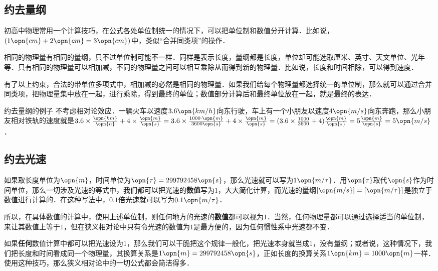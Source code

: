 
\subsection{约去量纲}

初高中物理常用一个计算技巧，在公式各处单位制统一的情况下，可以把单位制和数值分开计算．比如说，$(1\opn{cm}+2\opn{cm}=3\opn{cm})$中，类似“合并同类项”的操作．

相同的物理量有相同的量纲，只不过单位制可能不一样．同样是表示长度，量纲都是长度，单位却可能选取厘米、英寸、天文单位、光年等．只有相同的物理量可以相加减，不同的物理量之间可以相互乘除从而得到新的物理量．比如说，长度和时间相除，可以得到速度．

有了以上约束，合法的带单位多项式中，相加减的必然是相同的物理量．如果我们给每个物理量都选择统一的单位制，那么就可以通过合并同类项，把物理量集中放在一起，进行乘除，得到最终的单位；数值部分计算后和最终单位放在一起，就是最终的表达．

\begin{example}{约去量纲的例子}
不考虑相对论效应．一辆火车以速度$3.6\opn{km/h}$向东行驶，车上有一个小朋友以速度$4\opn{m/s}$向东奔跑，那么小朋友相对铁轨的速度就是$3.6\times\frac{\opn{km}}{\opn{h}}+4\times\frac{\opn{m}}{\opn{s}}=3.6\times\frac{1000\cdot \opn{m}}{3600\opn{s}}+4\times\frac{\opn{m}}{\opn{s}}=(3.6\times\frac{1000}{3600}+4)\frac{\opn{m}}{\opn{s}}=5\frac{\opn{m}}{\opn{s}}=5\opn{m/s}$．
\end{example}

\subsection{约去光速}

如果取长度单位为$\opn{m}$，时间单位为$\opn{\tau}=299792458\opn{s}$，那么光速就可以写为$1\opn{m/\tau}$．用$\opn{\tau}$取代$\opn{s}$作为时间单位，那么一切涉及光速的等式中，我们都可以把光速的\textbf{数值}写为$1$，大大简化计算，而光速的量纲$[\opn{m/s}]=[\opn{m/\tau}]$是独立于数值进行计算的．在这种写法中，$0.1$倍光速就可以写为$0.1\opn{m/\tau}$．

所以，在具体数值的计算中，使用上述单位制，则任何地方的光速的\textbf{数值}都可以视为$1$．当然，任何物理量都可以通过选择适当的单位制，来让其数值上等于$1$，但在狭义相对论中只有令光速的数值为$1$是最方便的，因为任何惯性系中光速都不变．

如果\textbf{任何}数值计算中都可以把光速设为$1$，那么我们可以干脆把这个规律一般化，把光速本身就当成$1$，没有量纲；或者说，这种情况下，我们把长度和时间看成同一个物理量，其换算关系是$1\opn{m}=299792458\opn{s}$，正如长度的换算关系$1\opn{km}=1000\opn{m}$一样．使用这种技巧，那么狭义相对论中的一切公式都会简洁得多．

